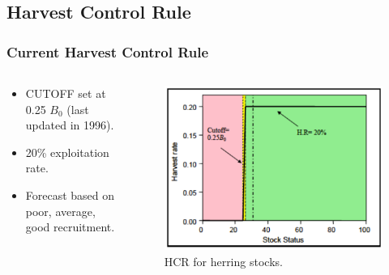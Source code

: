 \subsection{Harvest Control Rule} %
\label{sub:harvest_control_rule}
\begin{frame}[t]\frametitle{Current Harvest Control Rule}
	\begin{columns}
		\begin{column}[c]{0.5\textwidth}
			\begin{itemize}
				\item  CUTOFF set at 0.25 $B_0$ (last updated in 1996).
				\item 20\% exploitation rate.
				\item Forecast based on poor, average, good recruitment.
			\end{itemize}
	\end{column}
	\begin{column}[c]{0.5\textwidth}
		\begin{figure}[htbp]
			\centering
				\includegraphics[scale=.35]{../FIGS/Herring_HCR}
			\caption{HCR for herring stocks.}
			\label{fig:Herring_HCR}
		\end{figure}
	\end{column}
	\end{columns}
\end{frame}

